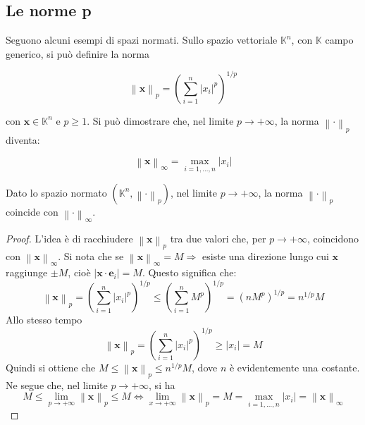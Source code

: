 \documentclass[11pt, a4paper]{scrartcl}
\theoremstyle{definition}
\numberwithin{esempio}{section}
\theoremstyle{definition}
\numberwithin{obs}{section}
\numberwithin{nota}{section}
\newenvironment{boxenv}[1][]{
    \begin{eqbox}[#1]
    }{
   \end{eqbox}
}
\numberwithin{equation}{subsection}
\begin{document}
\subsection{Le norme p}
Seguono alcuni esempi di spazi normati.
Sullo spazio vettoriale $\mathbb{K}^n$, con $\mathbb{K}$ campo generico, si pu\`o definire la norma
\begin{boxenv}[]
\begin{equation}
	\left\lVert \mathbf{x}  \right\rVert _p = \left(\sum_{i=1}^{n} \lvert x_i \rvert ^p\right) ^{1 / p}
\end{equation}
\end{boxenv}
\noindent con $\mathbf{x} \in \mathbb{K}^n$ e $p\ge 1$. 
Si pu\`o dimostrare che, nel limite $p \to +\infty$, la norma $\left\lVert \cdot  \right\rVert _p$ diventa:
\begin{boxenv}[]
\begin{equation}
	\left\lVert \mathbf{x}  \right\rVert _\infty = \max_{i=1,\ldots,n} \lvert x_i \rvert 
\end{equation}
\end{boxenv}
\begin{prop}
	{}{}
	Dato lo spazio normato $(\mathbb{K}^n,\left\lVert \cdot  \right\rVert _p)$, nel limite $p\to +\infty$, la norma $\left\lVert \cdot  \right\rVert _p$ coincide con $\left\lVert \cdot  \right\rVert _\infty$.
	\begin{proof}
		L'idea \`e di racchiudere $\left\lVert \mathbf{x}  \right\rVert _p$ tra due valori che, per $p\to +\infty$, coincidono con $\left\lVert \mathbf{x}  \right\rVert _\infty$.
		Si nota che se $\left\lVert \mathbf{x}  \right\rVert _\infty = M \Rightarrow $ esiste una direzione lungo cui $\mathbf{x} $ raggiunge $\pm M$, cio\`e $|\mathbf{x} \cdot \mathbf{e} _i| = M$. 
		Questo significa che:
		\[
			\left\lVert \mathbf{x}  \right\rVert _p = \left(\sum_{i=1}^{n} \lvert x_i \rvert ^p\right) ^{1 / p} \le \left(\sum_{i=1}^{n} M^{p} \right) ^{1 / p} = \left(n M^p\right) ^{1 / p} = n^{1 / p} M
		\] 
		Allo stesso tempo 
		\[
		\left\lVert \mathbf{x}  \right\rVert _p = \left(\sum_{i=1}^{n} \lvert x _i\rvert ^p\right) ^{1 / p}  \ge \lvert x_i \rvert = M
		\] 
		Quindi si ottiene che $M \le \left\lVert \mathbf{x}  \right\rVert _p \le n^{1 / p} M$, dove $n$ \`e evidentemente una costante.
		Ne segue che, nel limite $p\to +\infty$, si ha 
		\[
		M\le \lim_{p \to +\infty} \left\lVert \mathbf{x}  \right\rVert _p \le  M \iff \lim_{x \to +\infty} \left\lVert \mathbf{x}  \right\rVert _p = M = \max_{i=1 ,\ldots, n} \lvert x_i \rvert = \left\lVert \mathbf{x}  \right\rVert _\infty
		\] 
	\end{proof}
\end{prop}
\end{document}
